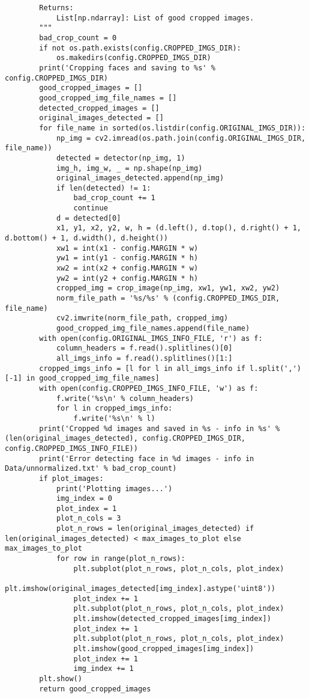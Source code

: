 \begin{verbatim}
        Returns:
            List[np.ndarray]: List of good cropped images.
        """
        bad_crop_count = 0
        if not os.path.exists(config.CROPPED_IMGS_DIR):
            os.makedirs(config.CROPPED_IMGS_DIR)
        print('Cropping faces and saving to %s' % config.CROPPED_IMGS_DIR)
        good_cropped_images = []
        good_cropped_img_file_names = []
        detected_cropped_images = []
        original_images_detected = []
        for file_name in sorted(os.listdir(config.ORIGINAL_IMGS_DIR)):
            np_img = cv2.imread(os.path.join(config.ORIGINAL_IMGS_DIR, file_name))
            detected = detector(np_img, 1)
            img_h, img_w, _ = np.shape(np_img)
            original_images_detected.append(np_img)
            if len(detected) != 1:
                bad_crop_count += 1
                continue
            d = detected[0]
            x1, y1, x2, y2, w, h = (d.left(), d.top(), d.right() + 1, d.bottom() + 1, d.width(), d.height())
            xw1 = int(x1 - config.MARGIN * w)
            yw1 = int(y1 - config.MARGIN * h)
            xw2 = int(x2 + config.MARGIN * w)
            yw2 = int(y2 + config.MARGIN * h)
            cropped_img = crop_image(np_img, xw1, yw1, xw2, yw2)
            norm_file_path = '%s/%s' % (config.CROPPED_IMGS_DIR, file_name)
            cv2.imwrite(norm_file_path, cropped_img)
            good_cropped_img_file_names.append(file_name)
        with open(config.ORIGINAL_IMGS_INFO_FILE, 'r') as f:
            column_headers = f.read().splitlines()[0]
            all_imgs_info = f.read().splitlines()[1:]
        cropped_imgs_info = [l for l in all_imgs_info if l.split(',')[-1] in good_cropped_img_file_names]
        with open(config.CROPPED_IMGS_INFO_FILE, 'w') as f:
            f.write('%s\n' % column_headers)
            for l in cropped_imgs_info:
                f.write('%s\n' % l)
        print('Cropped %d images and saved in %s - info in %s' % (len(original_images_detected), config.CROPPED_IMGS_DIR, config.CROPPED_IMGS_INFO_FILE))
        print('Error detecting face in %d images - info in Data/unnormalized.txt' % bad_crop_count)
        if plot_images:
            print('Plotting images...')
            img_index = 0
            plot_index = 1
            plot_n_cols = 3
            plot_n_rows = len(original_images_detected) if len(original_images_detected) < max_images_to_plot else max_images_to_plot
            for row in range(plot_n_rows):
                plt.subplot(plot_n_rows, plot_n_cols, plot_index)
                plt.imshow(original_images_detected[img_index].astype('uint8'))
                plot_index += 1
                plt.subplot(plot_n_rows, plot_n_cols, plot_index)
                plt.imshow(detected_cropped_images[img_index])
                plot_index += 1
                plt.subplot(plot_n_rows, plot_n_cols, plot_index)
                plt.imshow(good_cropped_images[img_index])
                plot_index += 1
                img_index += 1
        plt.show()
        return good_cropped_images


\end{verbatim}
